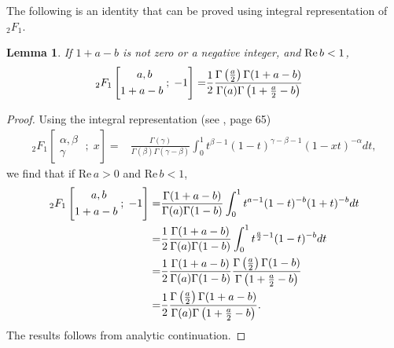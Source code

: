 \documentclass[reqno]{amsart}
\newtheorem{lemma}[theorem]{Lemma}
\theoremstyle{definition}
\theoremstyle{remark}
\numberwithin{equation}{section}
\begin{document}
The following is an identity that can be proved using integral representation of $_2F_1$.
\begin{lemma}\label{lemma9} If $1+a-b$ is not zero or a negative integer, and ${\displaystyle}\text{Re}\, b<1$,
\begin{align*}_2F_1\left[\begin{aligned} a, b\quad \\1+a-b\end{aligned}\;;\;-1\right]=&\frac{1}{2}\frac{{\displaystyle}\Gamma\left(\frac{a}{2}\right)\Gamma(1+a-b)}{\Gamma(a){\displaystyle}\Gamma\left(1+\frac{a}{2}-b\right)}
\end{align*}
\end{lemma}
\begin{proof}
Using the integral representation (see \cite{4}, page 65)
\begin{align*}
_2F_1\left[\begin{aligned} \alpha, \beta\\ \gamma\;\;\end{aligned}\;;\;x\right]=&\frac{\Gamma(\gamma)}{\Gamma(\beta)\Gamma(\gamma-\beta)}\int_0^1t^{\beta-1}(1-t)^{\gamma-\beta-1}(1-xt)^{-\alpha}dt,
\end{align*}we find that if $\text{Re}\,a>0$ and $\text{Re}\, b<1$,
\begin{align*}
_2F_1\left[\begin{aligned} a, b\quad \\1+a-b\end{aligned}\;;\;-1\right]=&\frac{\Gamma(1+a-b)}{\Gamma(a)\Gamma(1-b)}\int_0^1t^{a-1}(1-t)^{-b}(1+t)^{-b}dt\\
=&\frac{1}{2}\frac{\Gamma(1+a-b)}{\Gamma(a)\Gamma(1-b)}\int_0^{1}t^{\frac{a}{2}-1}(1-t)^{-b}dt\\
=&\frac{1}{2}\frac{\Gamma(1+a-b)}{\Gamma(a)\Gamma(1-b)} \frac{{\displaystyle}\Gamma\left(\frac{a}{2}\right)\Gamma(1-b)}{{\displaystyle}\Gamma\left(1+\frac{a}{2}-b\right)}\\
=&\frac{1}{2}\frac{{\displaystyle}\Gamma\left(\frac{a}{2}\right)\Gamma(1+a-b)}{\Gamma(a){\displaystyle}\Gamma\left(1+\frac{a}{2}-b\right)}.
\end{align*}
The results follows from analytic continuation.
\end{proof}
\end{document}
